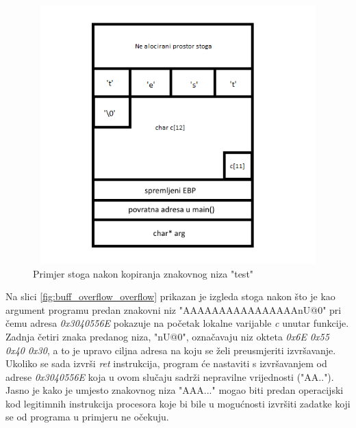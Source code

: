 \documentclass[times, utf8, diplomski, numeric]{fer}
\begin{document}
\begin{figure}[!ht]
\centering
\setlength\fboxsep{0pt}
\setlength\fboxrule{0.5pt}
\includegraphics[width=12cm, height=10cm]{slike/buffer_overflow_legitdata}
\caption{Primjer stoga nakon kopiranja znakovnog niza "test"}
\label{fig:buff_overflow_legitdata} 
\end{figure} 

Na slici \ref{fig:buff_overflow_overflow} prikazan je izgleda
stoga nakon što je kao argument programu predan znakovni niz
"AAAAAAAAAAAAAAAAnU@0" pri čemu adresa \emph{0x3040556E}				%
pokazuje na početak lokalne varijable \emph{c} unutar funkcije. 
Zadnja četiri znaka predanog niza, "nU@0", označavaju niz okteta
\emph{0x6E 0x55 0x40 0x30}, a to je upravo ciljna adresa na koju se 
želi preusmjeriti izvršavanje.
Ukoliko se sada izvrši \emph{ret} instrukcija, program će
nastaviti s izvršavanjem od adrese \emph{0x3040556E} koja u ovom
slučaju sadrži nepravilne vrijednosti ("AA.."). Jasno je kako je
umjesto znakovnog niza "AAA..." mogao biti predan operacijski kod
legitimnih instrukcija procesora koje bi bile u mogućnosti
izvršiti zadatke koji se od programa u primjeru ne očekuju.
\end{document}
